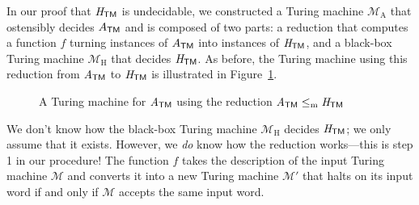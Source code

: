 In our proof that $\mathit{H}_{\textsf{TM}}$ is undecidable, we constructed a Turing machine $\mathcal{M}_{\mathrm{A}}$ that ostensibly decides $A_{\textsf{TM}}$ and is composed of two parts: a reduction that computes a function $f$ turning instances of $A_{\textsf{TM}}$ into instances of $\mathit{H}_{\textsf{TM}}$, and a black-box Turing machine $\mathcal{M}_{\mathrm{H}}$ that decides $\mathit{H}_{\textsf{TM}}$. As before, the Turing machine using this reduction from $\mathit{A}_{\textsf{TM}}$ to $\mathit{H}_{\textsf{TM}}$ is illustrated in Figure~\ref{fig:manyonereductionATMHTM}.

\begin{figure}
\centering
{}
\caption{A Turing machine for $\mathit{A}_{\textsf{TM}}$ using the reduction $\mathit{A}_{\textsf{TM}} \leq_{\mathrm{m}} \mathit{H}_{\textsf{TM}}$}
\label{fig:manyonereductionATMHTM}
\end{figure}

We don't know how the black-box Turing machine $\mathcal{M}_{\mathrm{H}}$ decides $\mathit{H}_{\textsf{TM}}$; we only assume that it exists. However, we \emph{do} know how the reduction works---this is step 1 in our procedure! The function $f$ takes the description of the input Turing machine $\mathcal{M}$ and converts it into a new Turing machine $\mathcal{M}'$ that halts on its input word if and only if $\mathcal{M}$ accepts the same input word.

